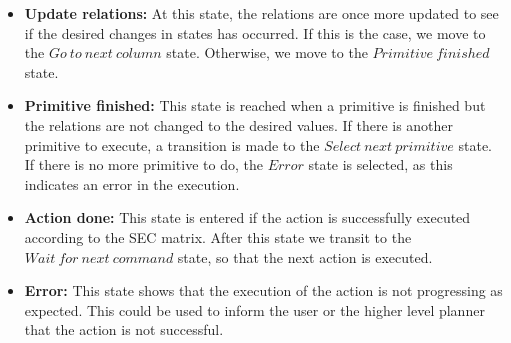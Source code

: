 \begin{itemize}
 \item \textbf{Update relations:} At this state, the relations are once more updated to see if the desired changes in states has occurred.
 If this is the case, we move to the $Go\ to\ next\ column$ state.
 Otherwise, we move to the $Primitive\ finished$ state.
 \item \textbf{Primitive finished:} This state is reached when a primitive is finished but the relations are not changed to the desired values.
 If there is another primitive to execute, a transition is made to the $Select\ next\ primitive$ state.
 If there is no more primitive to do, the $Error$ state is selected, as this indicates an error in the execution.
 \item \textbf{Action done:} This state is entered if the action is successfully executed according to the SEC matrix.
 After this state we transit to the $Wait\ for\ next\ command$ state, so that the next action is executed.
 \item \textbf{Error:} This state shows that the execution of the action is not progressing as expected.
 This could be used to inform the user or the higher level planner that the action is not successful.
\end{itemize}


